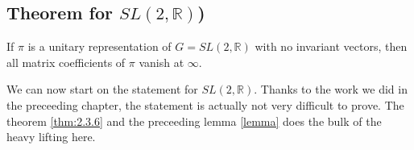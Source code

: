 \documentclass[
  12pt
]{article}
\theoremstyle{break}
\theoremstyle{plain}
\newcommand{\sltr}{\ensuremath{SL(2, \mathbb{R})}\xspace}
\begin{document}

  \hypertarget{theorem-for-sl2-r}{%
    \subsection{Theorem for \texorpdfstring{$SL(2, \mathbb{R})$}{SN(2, R)})}\label{theorem-for-sl2-r}}

  If $\pi$ is a unitary representation of $G = SL(2, \mathbb{R})$ with no
  invariant vectors, then all matrix coefficients of $\pi$ vanish at $\infty$.


  We can now start on the statement for \sltr. Thanks to the work we did in the
  preceeding chapter, the statement is actually not very difficult to prove. The
  theorem \ref{thm:2.3.6} and the preceeding lemma \ref{lemma} does the bulk of
  the heavy lifting here.
\end{document}
